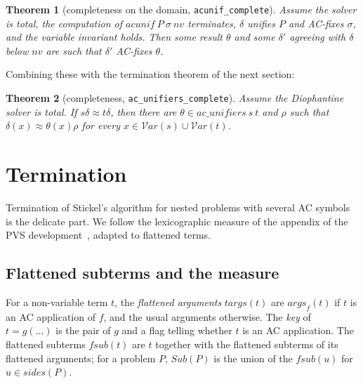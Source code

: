 \documentclass[11pt,a4paper]{article}
\newtheorem{theorem}{Theorem}[section]
\theoremstyle{definition}
\theoremstyle{remark}
\newcommand{\isa}[1]{\mbox{\small\texttt{#1}}}
\newcommand{\vars}{\mathcal{V}\mathit{ar}}
\newcommand{\eqAC}{\approx}
\newcommand{\args}{\mathit{args}}
\newcommand{\targs}{\mathit{targs}}
\newcommand{\fsub}{\mathit{fsub}}
\newcommand{\Sub}{\mathit{Sub}}
\newcommand{\sides}{\mathit{sides}}
\begin{document}
\begin{theorem}[completeness on the domain, \isa{acunif\_complete}]
  Assume the solver is total, the computation of $\mathit{acunif}\ P\ \sigma\ \mathit{nv}$
  terminates, $\delta$ unifies $P$ and AC-fixes $\sigma$, and the variable invariant holds. Then
  some result $\theta$ and some $\delta'$ agreeing with $\delta$ below $\mathit{nv}$ are such
  that $\delta'$ AC-fixes $\theta$.
\end{theorem}

Combining these with the termination theorem of the next section:

\begin{theorem}[completeness, \isa{ac\_unifiers\_complete}]
  Assume the Diophantine solver is total. If $s\delta \eqAC t\delta$, then there are
  $\theta \in \mathit{ac\_unifiers}\ s\ t$ and $\rho$ such that $\delta(x) \eqAC \theta(x)\rho$ for
  every $x \in \vars(s) \cup \vars(t)$.
\end{theorem}

\section{Termination}\label{sec:term}

Termination of Stickel's algorithm for nested problems with several AC symbols is the delicate
part. We follow the lexicographic measure of the appendix of the PVS
development~\cite{AyalaRincon24}, adapted to flattened terms.

\subsection{Flattened subterms and the measure}

For a non-variable term $t$, the \emph{flattened arguments} $\targs(t)$ are $\args_f(t)$ if $t$ is
an AC application of $f$, and the usual arguments otherwise. The \emph{key} of $t = g(\dots)$ is
the pair of $g$ and a flag telling whether $t$ is an AC application. The flattened subterms
$\fsub(t)$ are $t$ together with the flattened subterms of its flattened arguments; for a problem
$P$, $\Sub(P)$ is the union of the $\fsub(u)$ for $u \in \sides(P)$.
\end{document}
